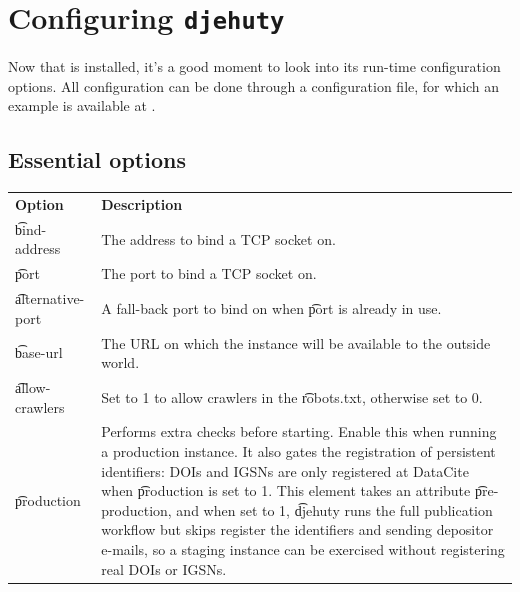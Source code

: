 \chapter{Configuring \texttt{djehuty}}
\label{chap:configuring-djehuty}
Now that  is installed, it's a good moment to look into its
run-time configuration options.  All configuration can be done through a
configuration file, for which an example is available at
.

\section{Essential options}
\label{sec:essential-options}

\begin{tabularx}{\textwidth}{*{1}{!{\VRule[-1pt]}l}!{\VRule[-1pt]}X}
  \headrow
  \textbf{Option}            & \textbf{Description}\\
  \t{bind-address}           & The address to bind a TCP socket on.\\
  \t{port}                   & The port to bind a TCP socket on.\\
  \t{alternative-port}       & A fall-back port to bind on when \t{port} is
                               already in use.\\
  \t{base-url}               & The URL on which the instance will be available
                               to the outside world.\\
  \t{allow-crawlers}         & Set to 1 to allow crawlers in the \t{robots.txt},
                               otherwise set to 0.\\
  \t{production}             & Performs extra checks before starting. Enable
                               this when running a production instance.  It
                               also gates the registration of persistent
                               identifiers: DOIs and IGSNs are only registered at
                               DataCite when \t{production} is set to 1.  This
                               element takes an attribute \t{pre-production},
                               and when set to 1, \t{djehuty} runs the full
                               publication workflow but skips register the
                               identifiers and sending depositor e-mails, so a
                               staging instance can be exercised without
                               registering real DOIs or IGSNs.\\

\end{tabularx}
